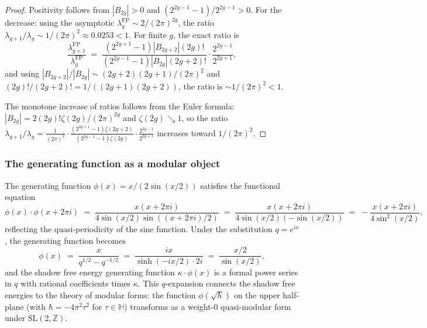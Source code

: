 \begin{proof}
Positivity follows from $|B_{2g}| > 0$ and $(2^{2g-1}-1)/2^{2g-1} > 0$. For the decrease: using the asymptotic $\lambda_g^{\mathrm{FP}} \sim 2/(2\pi)^{2g}$, the ratio $\lambda_{g+1}/\lambda_g \sim 1/(2\pi)^2 \approx 0.0253 < 1$. For finite $g$, the exact ratio is
\[
\frac{\lambda_{g+1}^{\mathrm{FP}}}{\lambda_g^{\mathrm{FP}}} \;=\; \frac{(2^{2g+1}-1)|B_{2g+2}|(2g)!}{(2^{2g-1}-1)|B_{2g}|(2g+2)!} \cdot \frac{2^{2g-1}}{2^{2g+1}},
\]
and using $|B_{2g+2}|/|B_{2g}| \sim (2g+2)(2g+1)/(2\pi)^2$ and $(2g)!/(2g+2)! = 1/((2g+1)(2g+2))$, the ratio is $\sim 1/(2\pi)^2 < 1$.

The monotone increase of ratios follows from the Euler formula: $|B_{2g}| = 2(2g)!\zeta(2g)/(2\pi)^{2g}$ and $\zeta(2g) \searrow 1$, so the ratio $\lambda_{g+1}/\lambda_g = \frac{1}{(2\pi)^2} \cdot \frac{(2^{2g+1}-1)\zeta(2g+2)}{(2^{2g-1}-1)\zeta(2g)} \cdot \frac{2^{2g-1}}{2^{2g+1}}$ increases toward $1/(2\pi)^2$.
\end{proof}

\subsubsection{The generating function as a modular object}

\begin{remark}
\label{rem:thqg-I-modular-gf}
The generating function $\phi(x) = x/(2\sin(x/2))$ satisfies the functional equation
\begin{equation}\label{eq:thqg-I-functional-equation}
\phi(x) \cdot \phi(x + 2\pi i) \;=\; \frac{x(x + 2\pi i)}{4\sin(x/2)\sin((x+2\pi i)/2)} \;=\; \frac{x(x + 2\pi i)}{4\sin(x/2)(-\sin(x/2))} \;=\; -\frac{x(x+2\pi i)}{4\sin^2(x/2)},
\end{equation}
reflecting the quasi-periodicity of the sine function. Under the substitution $q = e^{ix}$, the generating function becomes
\begin{equation}\label{eq:thqg-I-q-form}
\phi(x) \;=\; \frac{x}{q^{1/2} - q^{-1/2}} \;=\; \frac{ix}{\sinh(-ix/2) \cdot 2i} \;=\; \frac{x/2}{\sin(x/2)},
\end{equation}
and the shadow free energy generating function $\kappa \cdot \phi(x)$ is a formal power series in $q$ with rational coefficients times $\kappa$. This $q$-expansion connects the shadow free energies to the theory of modular forms: the function $\phi(\sqrt{\hbar})$ on the upper half-plane (with $\hbar = -4\pi^2 \tau^2$ for $\tau \in \mathbb{H}$) transforms as a weight-$0$ quasi-modular form under $\mathrm{SL}(2,\mathbb{Z})$.
\end{remark}

